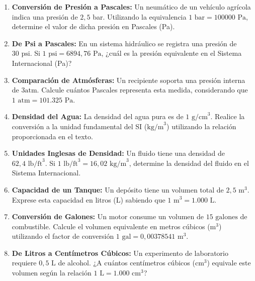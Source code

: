 \documentclass[../main]{subfiles}
\begin{document}

\begin{enumerate}
  \item \textbf{Conversión de Presión a Pascales:} Un neumático de un
    vehículo agrícola indica una presión de $2,5$ bar. Utilizando la
    equivalencia $1 \text{ bar} = 100000 \text{ Pa}$, determine el
    valor de dicha presión en Pascales (Pa).

  \item \textbf{De Psi a Pascales:} En un sistema hidráulico se
    registra una presión de $30 \text{ psi}$. Si $1 \text{ psi} =
    6894,76 \text{ Pa}$, ¿cuál es la presión equivalente en el
    Sistema Internacional (Pa)?

  \item \textbf{Comparación de Atmósferas:} Un recipiente soporta una
    presión interna de $3 \text{atm}$. Calcule cuántos Pascales
    representa esta medida, considerando que $1 \text{ atm} = 101.325
    \text{ Pa}$.

  \item \textbf{Densidad del Agua:} La densidad del agua pura es de
    $1 \text{ g/cm}^3$. Realice la conversión a la unidad fundamental
    del SI ($\text{kg/m}^3$) utilizando la relación proporcionada en el texto.

  \item \textbf{Unidades Inglesas de Densidad:} Un fluido tiene una
    densidad de $62,4 \text{ lb/ft}^3$. Si $1 \text{ lb/ft}^3 = 16,02
    \text{ kg/m}^3$, determine la densidad del fluido en el Sistema
    Internacional.

  \item \textbf{Capacidad de un Tanque:} Un depósito tiene un volumen
    total de $2,5 \text{ m}^3$. Exprese esta capacidad en litros (L)
    sabiendo que $1 \text{ m}^3 = 1.000 \text{ L}$.

  \item \textbf{Conversión de Galones:} Un motor consume un volumen
    de $15 \text{ galones}$ de combustible. Calcule el volumen
    equivalente en metros cúbicos ($\text{m}^3$) utilizando el factor
    de conversión $1 \text{ gal} = 0,00378541 \text{ m}^3$.

  \item \textbf{De Litros a Centímetros Cúbicos:} Un experimento de
    laboratorio requiere $0,5 \text{ L}$ de alcohol. ¿A cuántos
    centímetros cúbicos ($\text{cm}^3$) equivale este volumen según
    la relación $1 \text{ L} = 1.000 \text{ cm}^3$?


\end{enumerate}
\end{document}
